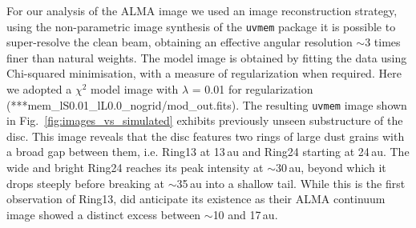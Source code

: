 \documentclass[letters,usenatbib,times]{mnras}
\begin{document}
For our analysis of the ALMA image we used an image reconstruction strategy, using the non-parametric image synthesis of the {\tt uvmem} package \citep{2006ApJ...639..951C, 2018A&C....22...16C} it is possible to super-resolve the clean beam, obtaining an effective angular resolution $\sim$3 times finer than natural weights. The model image is obtained by fitting the data using Chi-squared minimisation, with a measure of regularization when required. Here we adopted a $\chi^2$ model image with $\lambda$ = 0.01 for regularization (***mem\_lS0.01\_lL0.0\_nogrid/mod\_out.fits). The resulting {\tt uvmem} image shown in Fig.~\ref{fig:images_vs_simulated} exhibits previously unseen substructure of the disc. This image reveals that the disc features two rings of large dust grains with a broad gap between them, i.e. Ring13 at 13\,au and Ring24 starting at 24\,au. The wide and bright Ring24 reaches its peak intensity at $\sim$30\,au, beyond which it drops steeply before breaking at $\sim$35\,au into a shallow tail. While this is the first observation of Ring13, \citet{Ru_z_Rodr_guez_2019} did anticipate its existence as their ALMA continuum image showed a distinct excess between $\sim$10 and 17\,au.
\end{document}
